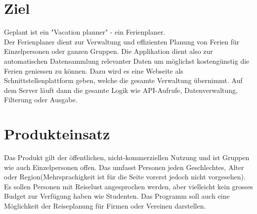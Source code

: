 \documentclass[10pt,a4paper,titlepage,twoside,german]{zhawreprt}
\begin{document}
\maketitle

\tableofcontents

\chapter{Ziel}\label{chp:Objective}
Geplant ist ein "Vacation planner" - ein Ferienplaner.\\
Der Ferienplaner dient zur Verwaltung und effizienten Planung von Ferien für Einzelpersonen oder ganzen Gruppen. Die Applikation dient also zur automatischen Datensammlung relevanter Daten um möglichst kostengünstig die Ferien geniessen zu können. Dazu wird es eine Webseite als Schnittstellenplattform geben, welche die gesamte Verwaltung übernimmt. Auf dem Server läuft dann die gesamte Logik wie API-Aufrufe, Datenverwaltung, Filterung oder Ausgabe.
\chapter{Produkteinsatz}\label{chp:FieldOfApplience}
Das Produkt gilt der öffentlichen, nicht-kommerziellen Nutzung und ist Gruppen wie auch Einzelpersonen offen. Das umfasst Personen jeden Geschlechtes, Alter oder Region(Mehrsprachigkeit ist für die Seite vorerst jedoch nicht vorgesehen). Es sollen Personen mit Reiselust angesprochen werden, aber vielleicht kein grosses Budget zur Verfügung haben wie Studenten. Das Programm soll auch eine Möglichkeit der Reiseplanung für Firmen oder Vereinen darstellen.
\end{document}
